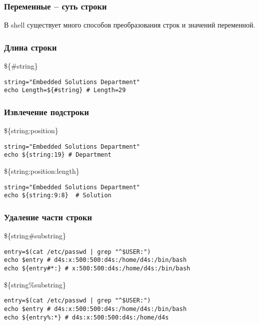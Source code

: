 

\begin{frame}
	\frametitle{Переменные -- суть строки}

	\begin{center}
	В shell существует много способов преобразования строк и значений переменной.
	\end{center}

\end{frame}


\begin{frame}[fragile]
	\frametitle{Длина строки}

	\begin{block}{\$\{\#string\}}
	\begin{lstlisting}
string="Embedded Solutions Department"
echo Length=${#string} # Length=29
	\end{lstlisting}
	\end{block}

\end{frame}


\begin{frame}[fragile]
	\frametitle{Извлечение подстроки}

	\begin{block}{\$\{string:position\}}
	\begin{lstlisting}
string="Embedded Solutions Department"
echo ${string:19} # Department
	\end{lstlisting}
	\end{block}

	\pause
	\begin{block}{\$\{string:position:length\}}
	\begin{lstlisting}
string="Embedded Solutions Department"
echo ${string:9:8}  # Solution
	\end{lstlisting}
	\end{block}

\end{frame}

\begin{frame}[fragile]
	\frametitle{Удаление части строки}

	\begin{block}{\$\{string\#substring\}}
	\begin{lstlisting}
entry=$(cat /etc/passwd | grep "^$USER:")
echo $entry # d4s:x:500:500:d4s:/home/d4s:/bin/bash
echo ${entry#*:} # x:500:500:d4s:/home/d4s:/bin/bash
	\end{lstlisting}
	\end{block}

	\pause

	\begin{block}{\$\{string\%substring\}}
	\begin{lstlisting}
entry=$(cat /etc/passwd | grep "^$USER:")
echo $entry # d4s:x:500:500:d4s:/home/d4s:/bin/bash
echo ${entry%:*} # d4s:x:500:500:d4s:/home/d4s 
	\end{lstlisting}
	\end{block}



\end{frame}


